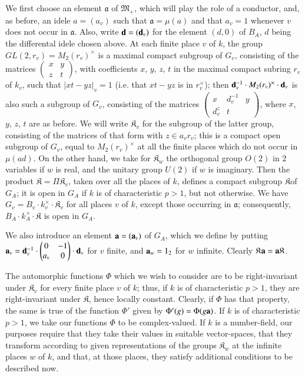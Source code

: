 We first choose an element $\mathfrak{a}$ of $\mathfrak{M}_{+}$, which will play the role of a conductor, and, as before, an idele $a=(a_{v})$ such that $\mathfrak{a}=\mu(a)$ and that $a_{v}=1$ whenever $v$ does not occur in $\mathfrak{a}$. Also, write $\mathbf{d}=(\mathbf{d}_{v})$ for the element $(d,0)$ of $B_{A}$, $d$ being the differental idele chosen above. At each finite place $v$ of $k$, the group $GL(2,r_{v})=M_{2}(r_{v})^{\times}$ is a maximal compact subgroup of $G_{v}$, consisting of the matrices $\left(\begin{matrix} x & y\\ z & t\end{matrix}\right)$, with coefficients $x$, $y$, $z$, $t$ in the maximal compact subring $r_{v}$ of $k_{v}$, such that $|xt-yz|_{v}=1$ (i.e. that $xt-yz$ is in $r^{\times}_{v}$); then $\mathbf{d}^{-1}_{v}\cdot M_{2}(r_{v})^{\times}\cdot \mathbf{d}_{v}$ is also such a subgroup of $G_{v}$, consisting of the matrices $\left(\begin{matrix} x & d^{-1}_{v} & y\\ d_{v}^{z} & t & \end{matrix}\right)$, where $x$, $y$, $z$, $t$ are as before. We will write $\mathfrak{K}_{v}$ for the subgroup of the latter group, consisting of the matrices of that form with $z\in a_{v}r_{v}$; this is a compact open subgroup of $G_{v}$, equal to $M_{2}(r_{v})^{\times}$ at all the finite places which do not occur in $\mu(ad)$. On the other hand, we take for $\mathfrak{K}_{w}$ the orthogonal group $O(2)$ in $2$ variables if $w$ is real, and the unitary group $U(2)$ if $w$ is imaginary. Then the product $\mathfrak{K}=\Pi \mathfrak{K}_{v}$, taken over all the places of $k$, defines a compact subgroup $\mathfrak{K}$\pageoriginale of $G_{A}$; it is open in $G_{A}$ if $k$ is of characteristic $p>1$, but not otherwise. We have $G_{v}=B_{v}\cdot k^{\times}_{v}\cdot \mathfrak{K}_{v}$ for all places $v$ of $k$, except those occurring in $\mathfrak{a}$; consequently, $B_{A}\cdot k^{\times}_{A}\cdot \mathfrak{K}$ is open in $G_{A}$.

We also introduce an element $\mathbf{a}=(\mathbf{a}_{v})$ of $G_{A}$, which we define by putting $\mathbf{a}_{v}=\mathbf{d}^{-1}_{v}\cdot \left(\begin{matrix} 0 & -1\\ a_{v} & 0\end{matrix}\right)\cdot \mathbf{d}_{v}$ for $v$ finite, and $\mathbf{a}_{w}=1_{2}$ for $w$ infinite. Clearly $\mathfrak{K}\mathbf{a}=\mathbf{a}\mathfrak{K}$.

The automorphic functions $\Phi$ which we wish to consider are to be right-invariant under $\mathfrak{K}_{v}$ for every finite place $v$ of $k$; thus, if $k$ is of characteristic $p>1$, they are right-invariant under $\mathfrak{K}$, hence locally constant. Clearly, if $\Phi$ has that property, the same is true of the function $\Phi'$ given by $\Phi'(g)=\Phi(g\mathbf{a})$. If $k$ is of characteristic $p>1$, we take our functions $\Phi$ to be complex-valued. If $k$ is a number-field, our purposes require that they take their values in suitable vector-spaces, that they transform according to given representations of the groups $\mathfrak{K}_{w}$ at the infinite places $w$ of $k$, and that, at those places, they satisfy additional conditions to be described now.


